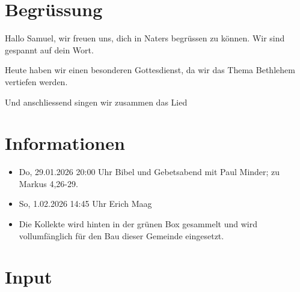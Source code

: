 \documentclass[fontsize=14pt]{mybib}
\newcommand{\Name}{Samuel}
\begin{document}
\section{Begrüssung}
Hallo \Name{}, wir freuen uns, dich in Naters begrüssen zu können. Wir sind gespannt auf dein Wort.

Heute haben wir einen besonderen Gottesdienst, da wir das Thema Bethlehem vertiefen werden.

\beten{} Und anschliessend singen wir zusammen das Lied



\section{Informationen}
\begin{itemize}
    \item {} Do, 29.01.2026 20:00 Uhr Bibel und Gebetsabend mit Paul Minder; zu Markus 4,26-29.
    \item {} So, 1.02.2026 14:45 Uhr Erich Maag
    \item {} Die Kollekte wird hinten in der grünen Box gesammelt und wird vollumfänglich für den Bau dieser Gemeinde eingesetzt.
\end{itemize}

\section{ Input }
\end{document}
